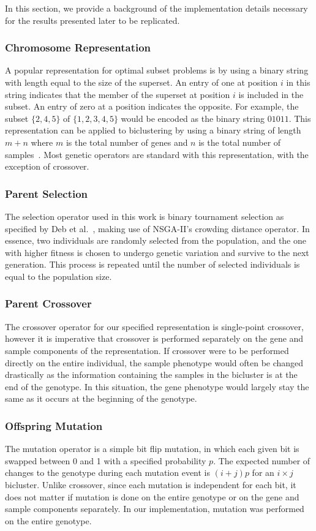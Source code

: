 In this section, we provide a background of the implementation details necessary for the results presented later to be replicated.


\subsubsection{Chromosome Representation}
A popular representation for optimal subset problems is by using a binary string with length equal to the size of the superset.
An entry of one at position $i$ in this string indicates that the member of the superset at position $i$ is included in the subset.
An entry of zero at a position indicates the opposite.
For example, the subset $\{2, 4, 5\}$ of $\{1, 2, 3, 4, 5\}$ would be encoded as the binary string $01011$.
This representation can be applied to biclustering by using a binary string of length $m+n$ where $m$ is the total number of genes and $n$ is the total number of samples~\cite{mitra2006multi}.
Most genetic operators are standard with this representation, with the exception of crossover.

\subsubsection{Parent Selection}
The selection operator used in this work is binary tournament selection as specified by Deb et al.~\cite{deb2002fast}, making use of NSGA-II's crowding distance operator.
In essence, two individuals are randomly selected from the population, and the one with higher fitness is chosen to undergo genetic variation and survive to the next generation.
This process is repeated until the number of selected individuals is equal to the population size.

\subsubsection{Parent Crossover}
The crossover operator for our specified representation is single-point crossover, however it is imperative that crossover is performed separately on the gene and sample components of the representation.
If crossover were to be performed directly on the entire individual, the sample phenotype would often be changed drastically as the information containing the samples in the bicluster is at the end of the genotype.
In this situation, the gene phenotype would largely stay the same as it occurs at the beginning of the genotype.

\subsubsection{Offspring Mutation}
The mutation operator is a simple bit flip mutation, in which each given bit is swapped between 0 and 1 with a specified probability $p$.
The expected number of changes to the genotype during each mutation event is $(i+j)p$ for an $i \times j$ bicluster.
Unlike crossover, since each mutation is independent for each bit, it does not matter if mutation is done on the entire genotype or on the gene and sample components separately.
In our implementation, mutation was performed on the entire genotype.

